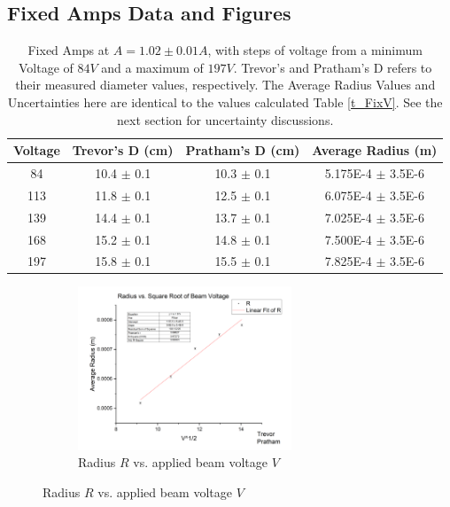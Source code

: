 \documentclass[12pt]{article}
\begin{document}
\clearpage

\subsection{Fixed Amps Data and Figures}

\begin{table}[h]
    \centering
    \begin{tabular}{|c|c|c|c|}
        \hline
        Voltage & Trevor's D (cm) & Pratham's D (cm) & Average Radius (m) \\ 
        \hline
        84 & 10.4 $\pm$ 0.1 & 10.3 $\pm$ 0.1 & 5.175E-4 $\pm$ 3.5E-6 \\ 
        113 & 11.8 $\pm$ 0.1 & 12.5 $\pm$ 0.1 & 6.075E-4 $\pm$ 3.5E-6 \\ 
        139 & 14.4 $\pm$ 0.1 & 13.7 $\pm$ 0.1 & 7.025E-4 $\pm$ 3.5E-6 \\ 
        168 & 15.2 $\pm$ 0.1 & 14.8 $\pm$ 0.1 & 7.500E-4 $\pm$ 3.5E-6 \\
        197 & 15.8 $\pm$ 0.1 & 15.5 $\pm$ 0.1 & 7.825E-4 $\pm$ 3.5E-6 \\
        \hline
    \end{tabular}
    \caption{Fixed Amps at $A = 1.02\pm0.01 A$, with steps of voltage from a minimum Voltage of $84V$ and a maximum of $197V$. Trevor's and Pratham's D refers to their measured diameter values, respectively. The Average Radius Values and Uncertainties here are identical to the values calculated Table \ref{t_FixV}. See the next section for uncertainty discussions.}
    \label{t_FixA}
\end{table}

\begin{figure} [h]
    \begin{subfigure}
        \centering
        \includegraphics[width=0.7\textwidth]{figures/EOM_Fix_Amps.png}
        \caption{Radius $R$ vs. applied beam voltage $V$}
        \label{p_FixA}
    \end{subfigure}
\end{figure}
\end{document}
